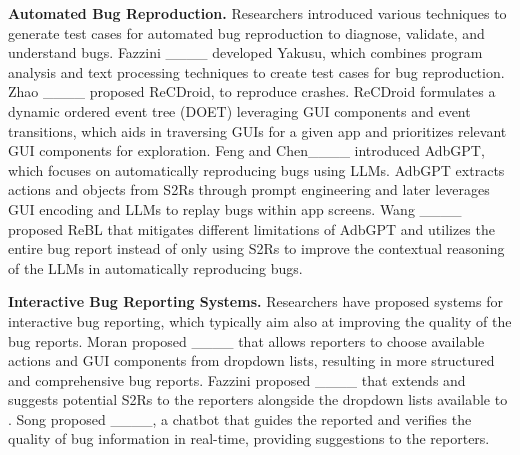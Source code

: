 \textbf{Automated Bug Reproduction.} 
Researchers introduced various techniques to generate test cases for automated bug reproduction to diagnose, validate, and understand bugs. Fazzini  \etal ____ developed Yakusu, which combines program analysis and text processing techniques to create test cases for bug reproduction.  
Zhao  \etal ____ proposed ReCDroid, to reproduce crashes. ReCDroid formulates a dynamic ordered event tree (DOET) leveraging GUI components and event transitions, which aids in traversing GUIs for a given app and prioritizes relevant GUI components for exploration. 
Feng and Chen____ introduced AdbGPT, which focuses on automatically reproducing bugs using LLMs. AdbGPT extracts actions and objects from S2Rs through prompt engineering and later leverages GUI encoding and LLMs to replay bugs within app screens. Wang  \etal ____ proposed ReBL that mitigates different limitations of AdbGPT and utilizes the entire bug report instead of only using S2Rs to improve the contextual reasoning of the LLMs in automatically reproducing bugs.

\textbf{Interactive Bug Reporting Systems.}
Researchers have proposed systems for interactive bug reporting, which typically aim also at improving the quality of the bug reports.
 Moran  \etal proposed \Fusion ____ that allows reporters to choose available actions and GUI components from dropdown lists, resulting in more structured and comprehensive bug reports. 
 Fazzini  \etal proposed \ebug ____ that extends \Fusion and suggests potential S2Rs to the reporters alongside the dropdown lists available to \Fusion.
 Song  \etal proposed \burt ____, a chatbot that guides the reported and verifies the quality of bug information in real-time, providing suggestions to the reporters.
